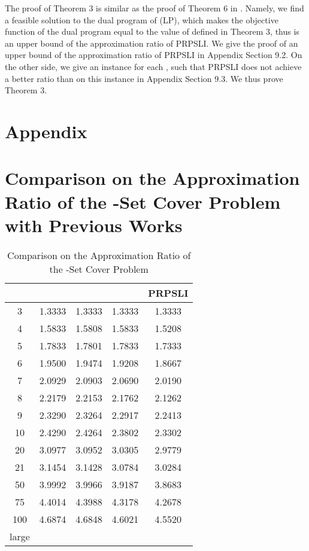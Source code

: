 \documentclass[runningheads,a4paper]{llncs}
\numberwithin{equation}{section}
\begin{document}
The proof of Theorem 3 is similar as the proof of Theorem 6 in \cite{lp}. Namely, we find a feasible solution to the dual program of (LP), which makes the objective function of the dual program equal to the value of  defined in Theorem 3, thus  is an upper bound of the approximation ratio of PRPSLI. We give the proof of an upper bound of the approximation ratio of PRPSLI in Appendix Section 9.2. On the other side, we give an instance for each , such that PRPSLI does not achieve a better ratio than  on this instance in Appendix Section 9.3. We thus prove Theorem 3.\\







\newpage



\section*{Appendix}

\section{Comparison on the Approximation Ratio of the -Set Cover Problem with Previous Works}

\begin{table}
\caption{Comparison on the Approximation Ratio of the -Set Cover Problem}
\begin{center}
\begin{tabular}{|c|c|c|c|c|}

  \hline
 & \cite{furer} & \cite{levin} & \cite{lp} & PRPSLI \\
  \hline
  3 & 1.3333 & 1.3333 & 1.3333 & 1.3333 \\
  4 & 1.5833 & 1.5808 & 1.5833 & 1.5208 \\
  5 & 1.7833 & 1.7801 & 1.7833 & 1.7333 \\
  6 & 1.9500 & 1.9474 & 1.9208 & 1.8667 \\
  7 & 2.0929 & 2.0903 & 2.0690 & 2.0190 \\
  8 & 2.2179 & 2.2153 & 2.1762 & 2.1262 \\
  9 & 2.3290 & 2.3264 & 2.2917 & 2.2413 \\
  10 & 2.4290 & 2.4264 & 2.3802 & 2.3302 \\
  20 & 3.0977 & 3.0952 & 3.0305 & 2.9779\\
  21 & 3.1454 & 3.1428 & 3.0784 & 3.0284\\
  50 & 3.9992 & 3.9966 & 3.9187 & 3.8683\\
  75 & 4.4014 & 4.3988 & 4.3178 & 4.2678\\
  100 & 4.6874 & 4.6848 & 4.6021 & 4.5520 \\
  \hline
  large  &  &  &  &  \\
  \hline
\end{tabular}
\end{center}
\end{table}
\end{document}
